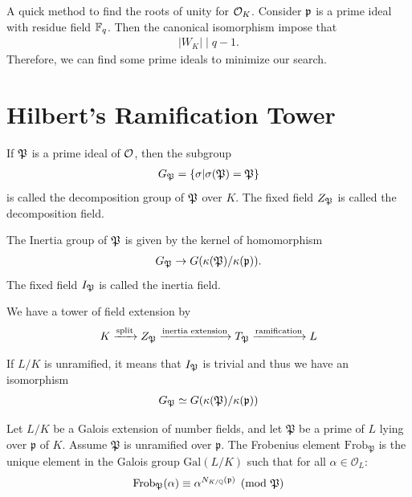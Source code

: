 {A quick method to find the roots of unity for $\ok$. Consider $\p$ is a prime ideal with residue field $\F_q$. Then the canonical isomorphism impose that 
\begin{align*}
    |W_K|\mid  q-1.
\end{align*}
Therefore, we can find some prime ideals to minimize our search.


\section*{Hilbert's Ramification Tower}

\begin{definition}
    If $\P$ is a prime ideal of $\o$, then the subgroup 
    \begin{align*}
        G_\P =\{\sigma|\sigma(\P)=\P\}
    \end{align*}
    is called the decomposition group of $\P$ over $K$. The fixed field $Z_\P$ is called the decomposition field. 
\end{definition}

\begin{definition}
    The Inertia group of $\P$ is given by the kernel of homomorphism
    \begin{align*}
        G_\P \to G(\kappa(\P)/\kappa(\p)).
    \end{align*}
    The fixed field $I_\P$ is called the inertia field. 
\end{definition}

We have a tower of field extension by 
\begin{align*}
    K\xrightarrow{\text{split}} Z_\P \xrightarrow{\text{inertia extension}} T_\P \xrightarrow{\text{ramification}} L
\end{align*}

If $L/K$ is unramified, it means that $I_\P$ is trivial and thus we have an isomorphism 
\begin{align*}
    G_\P \simeq G(\kappa(\P)/\kappa(\p))
\end{align*}

\begin{definition}
    Let $L/K$ be a Galois extension of number fields, and let $\mathfrak{P}$ be a prime of $L$ lying over $\mathfrak{p}$ of $K$. Assume $\mathfrak{P}$ is unramified over $\mathfrak{p}$. The Frobenius element $\text{Frob}_{\mathfrak{P}}$ is the unique element in the Galois group $\text{Gal}(L/K)$ such that for all $\alpha \in \mathcal{O}_L$:$$\text{Frob}_{\mathfrak{P}}(\alpha) \equiv \alpha^{N_{K/\Q}(\mathfrak{p})} \pmod{\mathfrak{P}}$$
\end{definition}

}
